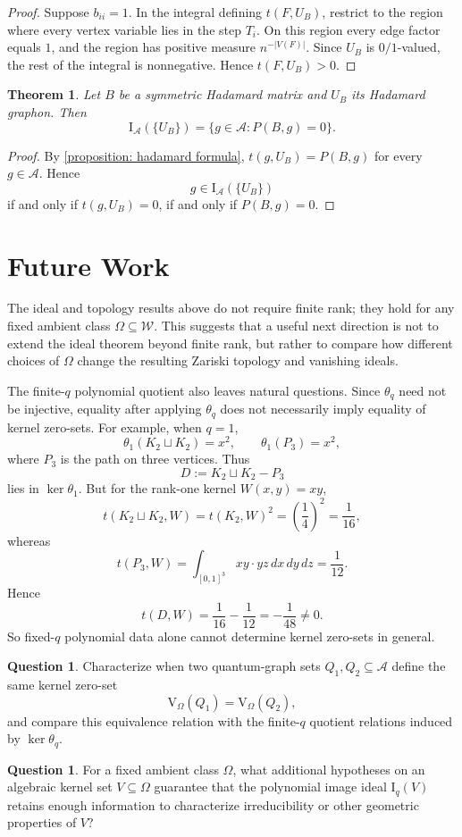 \documentclass[a4paper,12pt]{article}
\newtheorem{theorem}[lemma]{Theorem}
\theoremstyle{definition}
\newtheorem{question}[lemma]{Question}
\newcommand\cW{\mathcal{W}}
\newcommand\cA{\mathcal{A}}
\newcommand\V{\mathrm{V}_{\Omega}}
\newcommand\Iq{\mathrm{I}_{q}}
\newcommand\IA{\mathrm{I}_{\cA}}
\newcommand\thetaq{\theta_q}
\begin{document}
\begin{proof}
Suppose $b_{ii}=1$. In the integral defining $t(F,U_B)$, restrict to the region where every vertex variable lies in the step $T_i$. On this region every edge factor equals $1$, and the region has positive measure $n^{-|V(F)|}$. Since $U_B$ is $0/1$-valued, the rest of the integral is nonnegative. Hence $t(F,U_B)>0$.
\end{proof}

\begin{theorem}\label{theorem: hadamard ideal}
Let $B$ be a symmetric Hadamard matrix and $U_B$ its Hadamard graphon. Then
\[
    \IA(\{U_B\})=
    \{g\in\cA:P(B,g)=0\}.
\]
\end{theorem}

\begin{proof}
By \cref{proposition: hadamard formula}, $t(g,U_B)=P(B,g)$ for every $g\in\cA$. Hence
\[
    g\in\IA(\{U_B\})
\]
if and only if $t(g,U_B)=0$, if and only if $P(B,g)=0$.
\end{proof}

\section{Future Work}\label{section: Fut}

The ideal and topology results above do not require finite rank; they hold for any fixed ambient class $\Omega\subseteq\cW$. This suggests that a useful next direction is not to extend the ideal theorem beyond finite rank, but rather to compare how different choices of $\Omega$ change the resulting Zariski topology and vanishing ideals.

The finite-$q$ polynomial quotient also leaves natural questions. Since $\thetaq$ need not be injective, equality after applying $\thetaq$ does not necessarily imply equality of kernel zero-sets. For example, when $q=1$,
\[
    \theta_1(K_2\sqcup K_2)=x^2,
    \qquad
    \theta_1(P_3)=x^2,
\]
where $P_3$ is the path on three vertices. Thus
\[
    D:=K_2\sqcup K_2-P_3
\]
lies in $\ker\theta_1$. But for the rank-one kernel $W(x,y)=xy$,
\[
    t(K_2\sqcup K_2,W)=t(K_2,W)^2=\left(\frac14\right)^2=\frac1{16},
\]
whereas
\[
    t(P_3,W)=\int_{[0,1]^3}xy\cdot yz\,dx\,dy\,dz=\frac1{12}.
\]
Hence
\[
    t(D,W)=\frac1{16}-\frac1{12}=-\frac1{48}\neq0.
\]
So fixed-$q$ polynomial data alone cannot determine kernel zero-sets in general.

\begin{question}
Characterize when two quantum-graph sets $Q_1,Q_2\subseteq\cA$ define the same kernel zero-set
\[
    \V(Q_1)=\V(Q_2),
\]
and compare this equivalence relation with the finite-$q$ quotient relations induced by $\ker\thetaq$.
\end{question}

\begin{question}
For a fixed ambient class $\Omega$, what additional hypotheses on an algebraic kernel set $V\subseteq\Omega$ guarantee that the polynomial image ideal $\Iq(V)$ retains enough information to characterize irreducibility or other geometric properties of $V$?
\end{question}

\printbibliography
\end{document}
